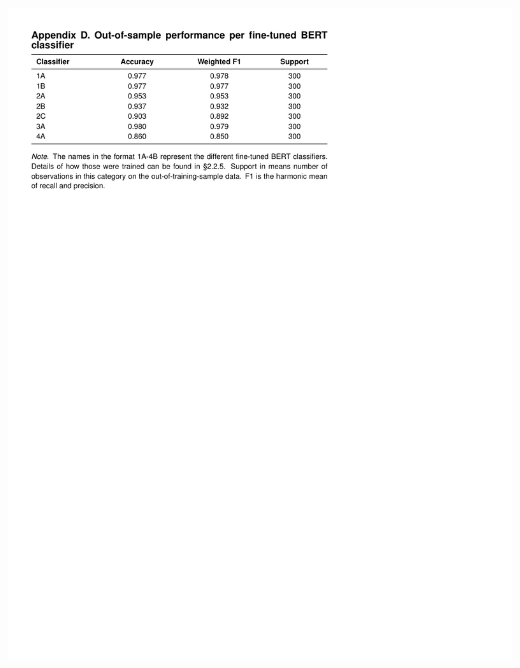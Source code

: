 \documentclass[
  12pt,
]{article}
\begin{document}
\begin{center}\includegraphics{../03_outputs/04_appendices/appendix_d} \end{center}
\end{document}
